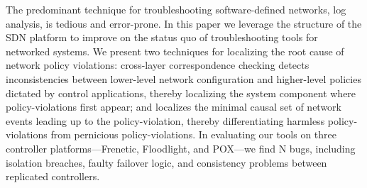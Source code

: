 The predominant technique for troubleshooting software-defined networks,
log analysis, is tedious and error-prone. In this paper we leverage the
structure of the SDN platform to
improve on the status quo of troubleshooting tools for networked systems.
We present two techniques for localizing the root cause of network policy
violations: cross-layer correspondence checking detects inconsistencies between lower-level
network configuration and higher-level policies dictated by control
applications, thereby localizing the system component where policy-violations first
appear; and \simulator{} localizes the minimal causal set of network events
leading up to the policy-violation, thereby differentiating harmless
policy-violations from pernicious policy-violations. In evaluating our tools on
three controller platforms---Frenetic, Floodlight, and POX---we find N bugs,
including isolation breaches,
faulty failover logic, and consistency problems between replicated
controllers.

